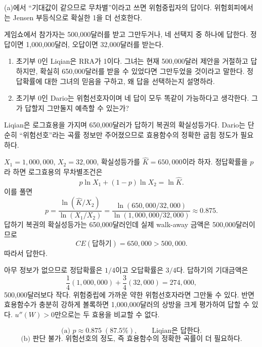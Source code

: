 \begin{warningbox}
(a)에서 ``기대값이 같으므로 무차별''이라고 쓰면 위험중립자의 답이다. 위험회피에서는 Jensen 부등식으로 확실한 1을 더 선호한다.
\end{warningbox}

\begin{officialbox}
게임쇼에서 참가자는 500,000달러를 받고 그만두거나, 네 선택지 중 하나에 답한다. 정답이면 1,000,000달러, 오답이면 32,000달러를 받는다.
\begin{enumerate}[label=(\alph*)]
\item 초기부 0인 Liqian은 RRA가 1이다. 그녀는 현재 500,000달러 제안을 거절하고 답하지만, 확실히 650,000달러를 받을 수 있었다면 그만두었을 것이라고 말한다. 정답확률에 대한 그녀의 믿음을 구하고, 왜 답을 선택하는지 설명하라.
\item 초기부 0인 Dario는 위험선호자이며 네 답이 모두 똑같이 가능하다고 생각한다. 그가 답할지 그만둘지 예측할 수 있는가?
\end{enumerate}
\end{officialbox}

\begin{strategybox}
Liqian은 로그효용을 가지며 650,000달러가 답하기 복권의 확실성등가다. Dario는 단순히 ``위험선호''라는 곡률 정보만 주어졌으므로 효용함수의 정확한 굽힘 정도가 필요하다.
\end{strategybox}

\begin{solutionbox}
$X_1=1{,}000{,}000$, $X_2=32{,}000$, 확실성등가를 $\widehat K=650{,}000$이라 하자. 정답확률을 $p$라 하면 로그효용의 무차별조건은
\[
p\ln X_1+(1-p)\ln X_2=\ln\widehat K.
\]
이를 풀면
\[
p=\frac{\ln(\widehat K/X_2)}{\ln(X_1/X_2)}
=\frac{\ln(650{,}000/32{,}000)}{\ln(1{,}000{,}000/32{,}000)}
\approx0.875.
\]
답하기 복권의 확실성등가는 650,000달러인데 실제 walk-away 금액은 500,000달러이므로
\[
CE(\text{답하기})=650{,}000>500{,}000.
\]
따라서 답한다.

아무 정보가 없으므로 정답확률은 $1/4$이고 오답확률은 $3/4$다. 답하기의 기대금액은
\[
\frac14(1{,}000{,}000)+\frac34(32{,}000)=274{,}000,
\]
500,000달러보다 작다. 위험중립에 가까운 약한 위험선호자라면 그만둘 수 있다. 반면 효용함수가 충분히 강하게 볼록하면 1,000,000달러의 상방을 크게 평가하여 답할 수 있다. $u''(W)>0$만으로는 두 효용을 비교할 수 없다.
\end{solutionbox}

\begin{answerbox}
\[
\text{(a) }p\approx0.875\;(87.5\%),\qquad \text{Liqian은 답한다.}
\]
\[
\text{(b) 판단 불가. 위험선호의 정도, 즉 효용함수의 정확한 곡률이 더 필요하다.}
\]
\end{answerbox}

